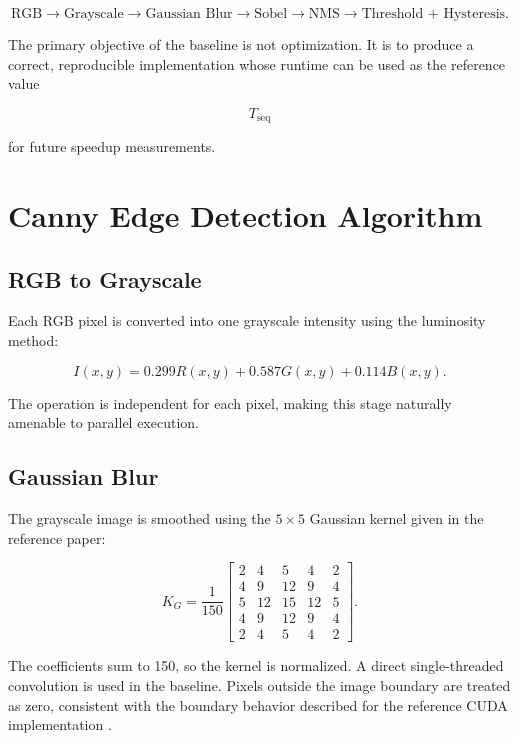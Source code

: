 \documentclass[conference]{IEEEtran}
\begin{document}
\begin{equation}
\text{RGB}
\rightarrow
\text{Grayscale}
\rightarrow
\text{Gaussian Blur}
\rightarrow
\text{Sobel}
\rightarrow
\text{NMS}
\rightarrow
\text{Threshold + Hysteresis}.
\end{equation}

The primary objective of the baseline is not optimization. It is to produce
a correct, reproducible implementation whose runtime can be used as the
reference value

\begin{equation}
T_{\mathrm{seq}}
\end{equation}

for future speedup measurements.

\section{Canny Edge Detection Algorithm}

\subsection{RGB to Grayscale}

Each RGB pixel is converted into one grayscale intensity using the luminosity
method:

\begin{equation}
I(x,y)=0.299R(x,y)+0.587G(x,y)+0.114B(x,y).
\end{equation}

The operation is independent for each pixel, making this stage naturally
amenable to parallel execution.

\subsection{Gaussian Blur}

The grayscale image is smoothed using the $5\times5$ Gaussian kernel given
in the reference paper:

\begin{equation}
K_G =
\frac{1}{150}
\begin{bmatrix}
2&4&5&4&2\\
4&9&12&9&4\\
5&12&15&12&5\\
4&9&12&9&4\\
2&4&5&4&2
\end{bmatrix}.
\end{equation}

The coefficients sum to 150, so the kernel is normalized. A direct
single-threaded convolution is used in the baseline. Pixels outside the
image boundary are treated as zero, consistent with the boundary behavior
described for the reference CUDA implementation \cite{horvath2023}.
\end{document}
